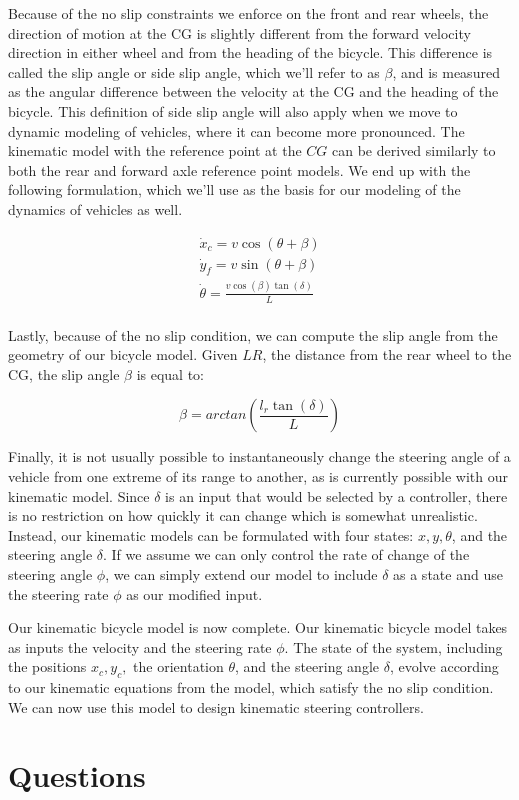 Because of the no slip constraints we enforce on the front and rear wheels, the direction of motion at the CG is slightly different from the forward velocity direction in either wheel and from the heading of the bicycle. This difference is called the slip angle or side slip angle, which we'll refer to as $\beta$, and is measured as the angular difference between the velocity at the CG and the heading of the bicycle. This definition of side slip angle will also apply when we move to dynamic modeling of vehicles, where it can become more pronounced. The kinematic model with the reference point at the $CG$ can be derived similarly to both the rear and forward axle reference point models. We end up with the following formulation, which we'll use as the basis for our modeling of the dynamics of vehicles as well. 

\begin{eqnarray}
\dot{x}_c = v\cos(\theta + \beta) \\
\dot{y}_f = v\sin(\theta + \beta) \\
\dot{\theta} = \frac{v\cos(\beta)\tan(\delta)}{L} \\
\end{eqnarray}


Lastly, because of the no slip condition, we can compute the slip angle from the geometry of our bicycle model. Given $LR$, the distance from the rear wheel to the CG, the slip angle $\beta$ is equal to:

\begin{equation}
\beta = arctan(\frac{l_r \tan(\delta)}{L})
\end{equation}

Finally, it is not usually possible to instantaneously change the steering angle of a vehicle from one extreme of its range to another, as is currently possible with our kinematic model. Since $\delta$ is an input that would be selected by a controller, there is no restriction on how quickly it can change which is somewhat unrealistic. Instead, our kinematic models can be formulated with four states: $x, y, \theta$, and the steering angle $\delta$. 
If we assume we can only control the rate of change of the steering angle $\phi$, we can simply extend our model to include $\delta$ as a state and use the steering rate $\phi$ as our modified input. 

Our kinematic bicycle model is now complete.  Our kinematic bicycle model takes as inputs the velocity and the steering rate $\phi$. The state of the system, including the positions $x_c, y_c,$ the orientation $\theta$, and the steering angle $\delta$, evolve according to our kinematic equations from the model, which satisfy the no slip condition. We can now use this model to design kinematic steering controllers. 


\section{Questions}
\label{questions_vehicle_kinematics_and_dynamics}




